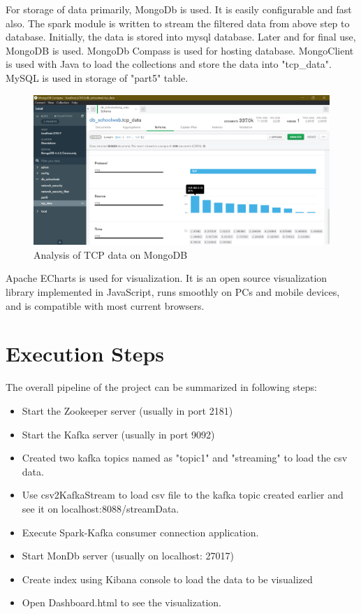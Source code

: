 \documentclass{article}
\begin{document}
For storage of data primarily, MongoDb is used. It is easily configurable and fast also. The spark module is written to stream the filtered data from above step to database. Initially, the data is stored into mysql database. Later and for final use, MongoDB is used. MongoDb Compass is used for hosting database. MongoClient is used with Java to load the collections and store the data into "tcp\_data". MySQL is used in storage of "part5" table.
\begin{figure}[h!]
\centering
\includegraphics[scale=0.35]{tcp_analysis_mongoDb.png}
\caption{Analysis of TCP data on MongoDB}
\label{fig:universe}
\end{figure}


Apache ECharts is used for visualization. It is an open source visualization library implemented in JavaScript, runs smoothly on PCs and mobile devices, and is compatible with most current browsers.

\section{Execution Steps}
The overall pipeline of the project can be summarized in following steps:
\begin{itemize}
    \item Start the Zookeeper server (usually in port 2181)
    \item Start the Kafka server (usually in port 9092)
    \item Created two kafka topics named as "topic1" and "streaming" to load the csv data.
    \item Use csv2KafkaStream to load csv file to the kafka topic created earlier and see it on localhost:8088/streamData.
    \item Execute Spark-Kafka consumer connection application.
    \item Start MonDb server (usually on localhost: 27017)
    \item Create index using Kibana console to load the data to be visualized
    \item Open Dashboard.html to see the visualization.
\end{itemize}
\end{document}
